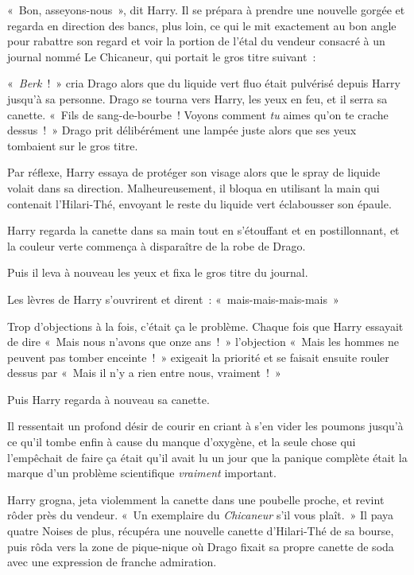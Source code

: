 «~Bon, asseyons-nous~», dit Harry. Il se prépara à prendre une nouvelle gorgée et regarda en direction des bancs, plus loin, ce qui le mit exactement au bon angle pour rabattre son regard et voir la portion de l'étal du vendeur consacré à un journal nommé Le Chicaneur, qui portait le gros titre suivant~:


«~\emph{Berk}~!~» cria Drago alors que du liquide vert fluo était pulvérisé depuis Harry jusqu'à sa personne. Drago se tourna vers Harry, les yeux en feu, et il serra sa canette. «~Fils de sang-de-bourbe~! Voyons comment \emph{tu} aimes qu'on te crache dessus~!~» Drago prit délibérément une lampée juste alors que ses yeux tombaient sur le gros titre.

Par réflexe, Harry essaya de protéger son visage alors que le spray de liquide volait dans sa direction. Malheureusement, il bloqua en utilisant la main qui contenait l'Hilari-Thé, envoyant le reste du liquide vert éclabousser son épaule.

Harry regarda la canette dans sa main tout en s'étouffant et en postillonnant, et la couleur verte commença à disparaître de la robe de Drago.

Puis il leva à nouveau les yeux et fixa le gros titre du journal.


Les lèvres de Harry s'ouvrirent et dirent~: «~mais-mais-mais-mais~»

Trop d'objections à la fois, c'était ça le problème. Chaque fois que Harry essayait de dire «~Mais nous n'avons que onze ans~!~» l'objection «~Mais les hommes ne peuvent pas tomber enceinte~!~» exigeait la priorité et se faisait ensuite rouler dessus par «~Mais il n'y a rien entre nous, vraiment~!~»

Puis Harry regarda à nouveau sa canette.

Il ressentait un profond désir de courir en criant à s'en vider les poumons jusqu'à ce qu'il tombe enfin à cause du manque d'oxygène, et la seule chose qui l'empêchait de faire ça était qu'il avait lu un jour que la panique complète était la marque d'un problème scientifique \emph{vraiment} important.

Harry grogna, jeta violemment la canette dans une poubelle proche, et revint rôder près du vendeur. «~Un exemplaire du \emph{Chicaneur} s'il vous plaît.~» Il paya quatre Noises de plus, récupéra une nouvelle canette d'Hilari-Thé de sa bourse, puis rôda vers la zone de pique-nique où Drago fixait sa propre canette de soda avec une expression de franche admiration.

